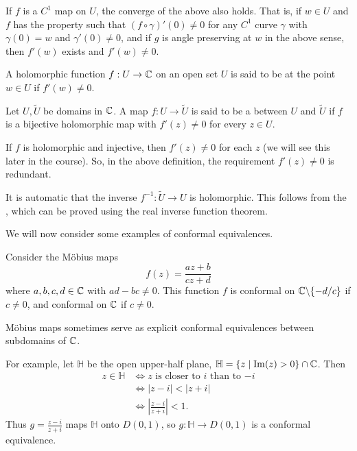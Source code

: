 \documentclass[a4paper]{scrartcl}
\begin{document}
\begin{remark}
    If $f$ is a $C^1$ map on $U$, the converge of the above also holds. That is, if $w \in U$ and $f$ has the property such that $(f \circ \gamma)'(0) \neq 0$ for any $C^1$ curve $\gamma$ with $\gamma(0) = w$ and $\gamma'(0) \neq 0$, and if $g$ is angle preserving at $w$ in the above sense, then $f'(w)$ exists and $f'(w) \neq 0$.
\end{remark}

\begin{definition}[Conformal]
    A holomorphic function $f: U \rightarrow \mathbb{C}$ on an open set $U$ is said to be  at the point $w \in U$ if $f'(w) \neq 0$.
\end{definition}

\begin{definition}
    Let $U, \tilde{U}$ be domains in $\mathbb{C}$. A map $f: U \rightarrow \tilde{U}$ is said to be a  between $U$ and $\tilde{U}$ if $f$ is a bijective holomorphic map with $f'(z) \neq 0$ for every $z \in U$.
\end{definition}

\begin{remark}[Redundancy]
    If $f$ is holomorphic and injective, then $f'(z) \neq 0$ for each $z$ (we will see this later in the course). So, in the above definition, the requirement $f'(z) \neq 0$ is redundant.
\end{remark}

\begin{remark}
    It is automatic that the inverse $f^{-1}: \tilde{U} \rightarrow U$ is holomorphic. This follows from the , which can be proved using the real inverse function theorem.
\end{remark}

We will now consider some examples of conformal equivalences.

\begin{example}
    Consider the Möbius maps
    $$
f(z) = \frac{az + b}{cz + d}
    $$
    where $a, b, c, d \in \mathbb{C}$ with $ad - bc \neq 0$. This function $f$ is conformal on $\mathbb{C} \backslash \{-d/c\}$ if $c \neq 0$, and conformal on $\mathbb{C}$ if $c \neq 0$.

    Möbius maps sometimes serve as explicit conformal equivalences between subdomains of $\mathbb{C}$.

    For example, let $\mathbb{H}$ be the open upper-half plane, $\mathbb{H} = \{z \mid \operatorname{Im}(z) > 0\} \cap \mathbb{C}$. Then
    \begin{align*}
        z \in \mathbb{H} &\iff z \text{ is closer to $i$ than to $-i$} \\
&\iff |z - i| < |z + i| \\
&\iff \left|\frac{z - i}{z + i}\right| < 1.
    \end{align*}
    Thus $g = \frac{z - i}{z + i}$ maps $\mathbb{H}$ onto $D(0, 1)$, so $g: \mathbb{H} \rightarrow D(0, 1)$ is a conformal equivalence.
\end{example}
\end{document}
